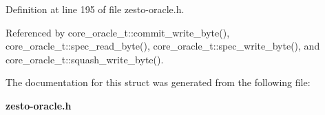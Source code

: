 Definition at line 195 of file zesto-oracle.h.

Referenced by core\_\-oracle\_\-t::commit\_\-write\_\-byte(), core\_\-oracle\_\-t::spec\_\-read\_\-byte(), core\_\-oracle\_\-t::spec\_\-write\_\-byte(), and core\_\-oracle\_\-t::squash\_\-write\_\-byte().

The documentation for this struct was generated from the following file:\begin{CompactItemize}
\item 
{\bf zesto-oracle.h}\end{CompactItemize}

